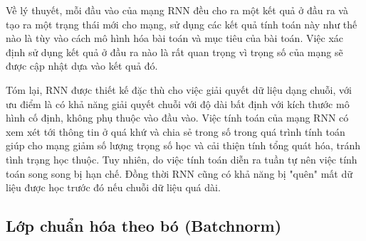 Về lý thuyết, mỗi đầu vào của mạng RNN đều cho ra một kết quả ở đầu ra và tạo ra một trạng thái mới cho mạng, sử dụng các kết quả tính toán này như thế nào là tùy vào cách mô hình hóa bài toán và mục tiêu của bài toán. Việc xác định sử dụng kết quả ở đầu ra nào là rất quan trọng vì trọng số của mạng sẽ được cập nhật dựa vào kết quả đó.

Tóm lại, RNN được thiết kế đặc thù cho việc giải quyết dữ liệu dạng chuỗi, với ưu điểm là có khả năng giải quyết chuỗi với độ dài bất định với kích thước mô hình cố định, không phụ thuộc vào đầu vào. Việc tính toán của mạng RNN có xem xét tới thông tin ở quá khứ và chia sẻ trong số trong quá trình tính toán giúp cho mạng giảm số lượng trọng số học và cải thiện tính tổng quát hóa, tránh tình trạng học thuộc. Tuy nhiên, do việc tính toán diễn ra tuần tự nên việc tính toán song song bị hạn chế. Đồng thời RNN cũng có khả năng bị "quên" mất dữ liệu được học trước đó nếu chuỗi dữ liệu quá dài.




\subsection{Lớp chuẩn hóa theo bó (Batchnorm)}

